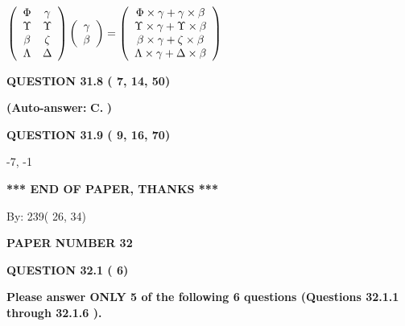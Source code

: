 \documentclass[12pt]{article}
\begin{document}
$  %
 \left( \begin{array}
 {
 c
 c
 }
 \Phi & 
 \gamma \\ 
 \Upsilon & 
 \Upsilon \\ 
 \beta & 
                    \zeta \\ 
 \Lambda & 
 \Delta
 \end{array} \right)
 \left( \begin{array}
 {
 c
 }
 \gamma \\ 
 \beta
 \end{array} \right)
=
  \left( \begin{array}
 {
 c
 }
 \Phi \times  \gamma   +  \gamma \times  \beta \\ 
 \Upsilon \times  \gamma   +  \Upsilon \times  \beta \\ 
 \beta \times  \gamma   +                     \zeta \times  \beta \\ 
 \Lambda \times  \gamma   +  \Delta \times  \beta
 \end{array} \right)
$
 
  
  
{\textbf{\large{QUESTION
31.8 
 (          7,         14,         50)
}}}
 
 
{\textbf{(Auto-answer:}}
{\textbf{\large{
C.}}}
{\textbf{)}}
 
 
  
  
{\textbf{\large{QUESTION
31.9 
 (          9,         16,         70)
}}}

-7,  %
-1
 
   
   
   
   
\vspace{1.0in} 
{\textbf{\large{ *** END OF PAPER, THANKS *** }}} 
   
   
\hspace{1.0in} By: 
         239(         26,          34)
   
   
   
   
\newpage 
\setcounter{page}{ 
    32001 } 
   
   
 {\textbf{ \Large{ PAPER NUMBER          32 }}}
   
   
   
   
  
\vspace{0.2in}
  
{\textbf{\Large{QUESTION
32.1 
 (          6)
}}}
  
  
{\textbf{\Large{Please answer ONLY  %
           5 %
 of the following  %
           6 %
 questions (Questions  %
32.1.1 %
 through  %
32.1.6 %
 ). }}}
   
\end{document}
